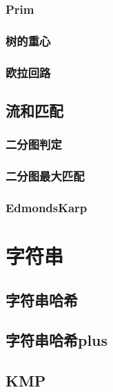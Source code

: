 \subsubsection{Prim}


\subsubsection{树的重心}


\subsubsection{欧拉回路}

\subsection{流和匹配}
\subsubsection{二分图判定}


\subsubsection{二分图最大匹配}


\subsubsection{EdmondsKarp}


\section{字符串}
\subsection{字符串哈希}


\subsection{字符串哈希plus}

\subsection{KMP}


